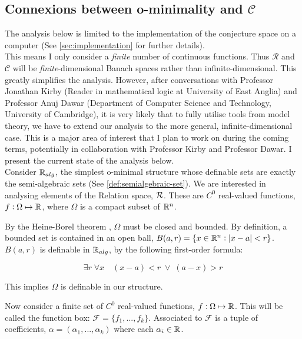 % 
\subsection{Connexions between o-minimality and \texorpdfstring{$\mathcal{C}$}{C}}
\label{sec:ominimal-connexions}
The analysis below is limited to the implementation of the conjecture space
on a computer (See \ref{sec:implementation} for further details).\\ 
This means I only consider a \textit{finite} number of continuous functions. Thus $\mathcal{R}$ and $\mathcal{C}$ will be \textit{finite}-dimensional Banach spaces rather than infinite-dimensional. This greatly simplifies the analysis. However, after conversations with Professor Jonathan Kirby (Reader in mathematical logic at University of East Anglia) and Professor Anuj Dawar (Department of Computer Science and Technology, University of Cambridge), it is very likely that to fully utilise tools from model theory, we have to extend our analysis to the more general, infinite-dimensional case.
This is a major area of interest that I plan to work on during the coming terms, potentially in collaboration with Professor Kirby and Professor Dawar. I present the current state of the analysis below.\\
% 

Consider $\mathbb{R}_{alg}$\cite{Dries_1998}, the simplest o-minimal structure whose definable sets are exactly the semi-algebraic sets (See \ref{def:semialgebraic-set}). We are interested in analysing elements of the Relation space, $\mathcal{R}$.
These are $C^0$ real-valued functions, $f:\Omega\mapsto\mathbb{R}$, where $\Omega$ is a compact subset of $\mathbb{R}^n$.

By the Heine-Borel theorem \cite{Caradus_1967}, $\Omega$ must be closed and bounded. By definition, a bounded set is contained in an open ball, $B(a,r) = \{x\in\mathbb{R}^n:|x - a| < r\}$. \\$B(a, r)$ is definable in $\mathbb{R}_{alg}$, by the following first-order formula:

\begin{equation*}
    \exists r\;\forall x \quad (x - a) < r\; \vee \; (a - x) > r
\end{equation*}

This implies $\Omega$ is definable in our structure.

Now consider a  finite set of $C^0$ real-valued functions, $f:\Omega\mapsto\mathbb{R}$. This will be called the function box: $\mathcal{F} = \{f_1,...,f_k\}$. Associated to $\mathcal{F}$ is a tuple of coefficients, $\alpha = (\alpha_1,...,\alpha_k)$ where each $\alpha_i\in\mathbb{R}$.

